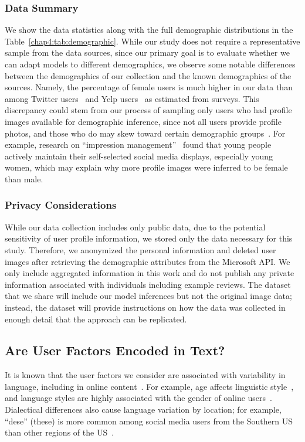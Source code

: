 \subsubsection{Data Summary}
We show the data statistics along with the full demographic distributions in the Table~\ref{chap4:tab:demographic}.
While our study does not require a representative sample from the data sources,
since our primary goal is to evaluate whether we can adapt models to different demographics,
we observe some notable differences between the demographics of our collection and the known demographics of the sources.
Namely, the percentage of female users is much higher in our data than among Twitter users~\cite{fontein2016top} and Yelp users~\cite{yelp_2018} as estimated from surveys. 
This discrepancy could stem from our process of sampling only users who had profile images available for demographic inference,
since not all users provide profile photos,
and those who do may skew toward certain demographic groups~\cite{rose2012face}.
For example, research on ``impression management''~\cite{rose2012face} found that young people actively maintain their self-selected social media displays, especially young women, which may explain why more profile images were inferred to be female than male.

\subsubsection{Privacy Considerations}

While our data collection includes only public data, 
due to the potential sensitivity of user profile information,
we stored only the data necessary for this study.
Therefore, we anonymized the personal information and deleted user images after retrieving the demographic attributes from the Microsoft API. 
We only include aggregated information in this work and do not publish any private information associated with individuals including example reviews. 
The dataset that we share will include our model inferences but not the original image data; instead, the dataset will provide 
instructions on how the data was collected in enough detail that the approach can be replicated.


\subsection{Are User Factors Encoded in Text?}
\label{chap4:subsec:analysis}

It is known that the user factors we consider are associated with variability in language, including in online content~\cite{hovy2015demographic}.
For example, age affects linguistic style~\cite{wagner2012age},
and language styles are highly associated with the gender of online users~\cite{hovy2018capturing}.
Dialectical differences also cause language variation by location;
for example, ``dese'' (these) is more common among social media users from the Southern US than other regions of the US~\cite{goel2016social}.

